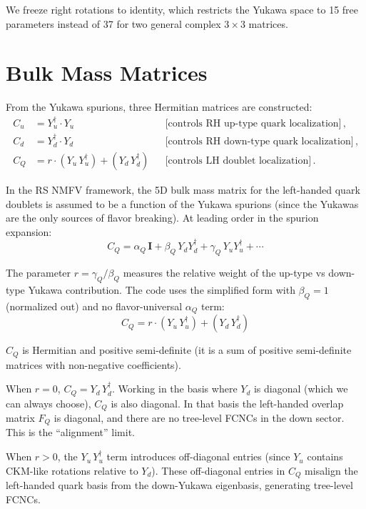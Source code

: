 \documentclass[11pt]{article}
\begin{document}
We freeze right rotations to identity, which restricts the Yukawa space to 15
free parameters instead of 37 for two general complex $3\times 3$ matrices.

\section{Bulk Mass Matrices}
\label{sec:step4}

From the Yukawa spurions, three Hermitian matrices are constructed:
\begin{align}
  C_u &= Y_u^\dagger \cdot Y_u
    &&\text{[controls RH up-type quark localization]}\,, \\
  C_d &= Y_d^\dagger \cdot Y_d
    &&\text{[controls RH down-type quark localization]}\,, \\
  C_Q &= r \cdot (Y_u\,Y_u^\dagger) + (Y_d\,Y_d^\dagger)
    &&\text{[controls LH doublet localization]}\,.
\end{align}

In the RS NMFV framework, the 5D
bulk mass matrix for the left-handed quark doublets is assumed to be a function
of the Yukawa spurions (since the Yukawas are the only sources of flavor
breaking).  At leading order in the spurion expansion:
\begin{equation}
  C_Q = \alpha_Q\,\mathbf{I} + \beta_Q\,Y_d Y_d^\dagger
    + \gamma_Q\,Y_u Y_u^\dagger + \cdots
\end{equation}

The parameter $r = \gamma_Q/\beta_Q$ measures the relative weight of the
up-type vs down-type Yukawa contribution.  The code uses the simplified form
with $\beta_Q = 1$ (normalized out) and no flavor-universal $\alpha_Q$ term:
\begin{equation}
  C_Q = r\cdot(Y_u\,Y_u^\dagger) + (Y_d\,Y_d^\dagger)
\end{equation}

$C_Q$ is Hermitian and positive semi-definite (it is a sum of positive
semi-definite matrices with non-negative coefficients).

When $r = 0$, $C_Q = Y_d\,Y_d^\dagger$.  Working
in the basis where $Y_d$ is diagonal (which we can always choose), $C_Q$ is
also diagonal.  In that basis the left-handed overlap matrix $F_Q$ is diagonal,
and there are no tree-level FCNCs in the down sector.  This is the ``alignment''
limit.

When $r > 0$, the $Y_u\,Y_u^\dagger$ term introduces off-diagonal entries
(since $Y_u$ contains CKM-like rotations relative to $Y_d$).  These
off-diagonal entries in $C_Q$ misalign the left-handed quark basis from the
down-Yukawa eigenbasis, generating tree-level FCNCs.
\end{document}
